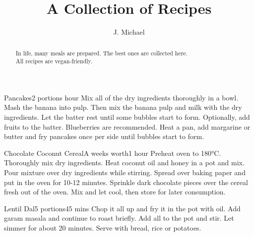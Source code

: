 \documentclass[]{article}
\title{A Collection of Recipes}
\author{J. Michael}
\begin{document}
\maketitle

\tableofcontents

\begin{abstract}
In life, many meals are prepared.
The best ones are collected here. \\
All recipes are vegan-friendly.
\end{abstract}

\begin{recipe}{Pancakes}{2 portions}{ hour}
	Mix all of the dry ingredients thoroughly in a bowl.
	Mash the banana into pulp.
	Then mix the banana pulp and milk with the dry ingredients.
	Let the batter rest until some bubbles start to form.
	Optionally, add fruits to the batter.
	Blueberries are recommended.
	Heat a pan, add margarine or butter and fry pancakes once per side until bubbles start to form.
\end{recipe}

\begin{recipe}{Chocolate Coconut Cereal}{A weeks worth}{1 hour}
	Preheat oven to 180°C.
	Thoroughly mix dry ingredients.
	Heat coconut oil and honey in a pot and mix.
	Pour mixture over dry ingredients while stirring.
	\newstep
	Spread over baking paper and put in the oven for 10-12 minutes.
	Sprinkle dark chocolate pieces over the cereal fresh out of the oven.
	Mix and let cool, then store for later consumption.
\end{recipe}

\begin{recipe}{Lentil Dal}{5 portions}{45 mins}
	Chop it all up and fry it in the pot with oil.
	Add garam masala and continue to roast briefly.
	Add all to the pot and stir.
	Let simmer for about 20 minutes.
	\newstep
	Serve with bread, rice or potatoes.
\end{recipe}
\end{document}
